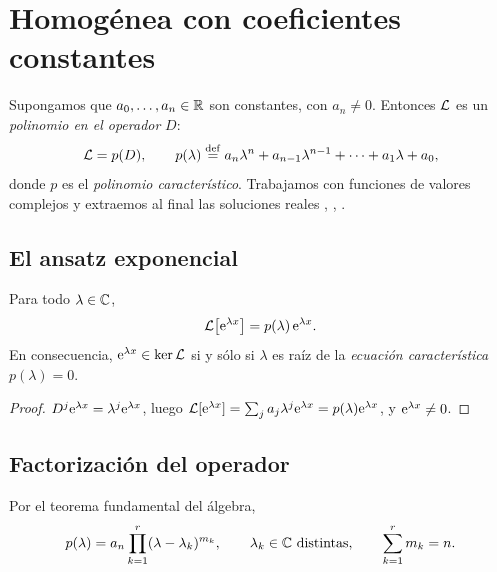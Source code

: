 \section{Homogénea con coeficientes constantes}\label{sec:constantes}

Supongamos que $a_0,\dots,a_n\in\mathbb{R}$ son constantes, con $a_n\neq0$. Entonces
$\mathcal{L}$ es un \emph{polinomio en el operador} $D$:
\begin{equation}\label{eq:pD}
  \mathcal{L}=p(D),\qquad p(\lambda)\mathrel{\overset{\mathrm{def}}{=}} a_n\lambda^{n}+a_{n-1}\lambda^{n-1}+\dots+a_1\lambda+a_0 ,
\end{equation}
donde $p$ es el \emph{polinomio característico}. Trabajamos con funciones
de valores complejos y extraemos al final las soluciones reales
\cite[cap.~IV]{TEMARIO}, \cite{ELSGOLTZ}, \cite[cap.~4]{BOYCE}.

\subsection{El ansatz exponencial}\label{sec:ansatz}

\begin{proposicion}\label{prop:autofuncion}
Para todo $\lambda\in\mathbb{C}$,
\begin{equation}\label{eq:autofuncion}
  \mathcal{L}\bigl[\mathrm{e}^{\lambda x}\bigr]=p(\lambda)\,\mathrm{e}^{\lambda x}.
\end{equation}
En consecuencia, $\mathrm{e}^{\lambda x}\in\operatorname{ker}\mathcal{L}$ si y sólo si $\lambda$ es raíz de
la \emph{ecuación característica} $p(\lambda)=0$.
\end{proposicion}

\begin{proof}
$D^{j}\mathrm{e}^{\lambda x}=\lambda^{j}\mathrm{e}^{\lambda x}$, luego
$\mathcal{L}[\mathrm{e}^{\lambda x}]=\sum_j a_j\lambda^{j}\mathrm{e}^{\lambda x}=p(\lambda)\mathrm{e}^{\lambda x}$,
y $\mathrm{e}^{\lambda x}\neq0$.
\end{proof}

\subsection{Factorización del operador}\label{sec:factorizacion}
Por el teorema fundamental del álgebra,
\begin{equation}\label{eq:factorizacion-p}
  p(\lambda)=a_n\prod_{k=1}^{r}(\lambda-\lambda_k)^{m_k},
  \qquad \lambda_k\in\mathbb{C}\ \text{distintas},\qquad \sum_{k=1}^{r}m_k=n .
\end{equation}

